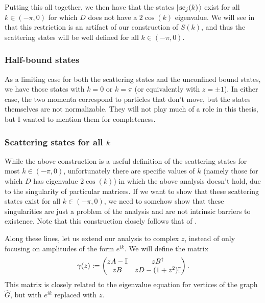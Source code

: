 \documentclass[../thesis-main/thesis-main]{subfiles}
\begin{document}
Putting this all together, we then have that the states $|\mspace{2mu} \text{sc}_j(k) \mspace{2mu} \rangle$ exist for all $k\in (-\pi,0)$ for which $D$ does not have a $2\cos(k)$ eigenvalue.  We will see in  that this restriction is an artifact of our construction of $S(k)$, and thus the scattering states will be well defined for all $k\in (-\pi,0)$.


\subsubsection{Half-bound states}

As a limiting case for both the scattering states and the unconfined bound states, we have those states with $k = 0$ or $k= \pi$ (or equivalently with $z = \pm 1$).  In either case, the two momenta correspond to particles that don't move, but the states themselves are not normalizable.  They will not play much of a role in this thesis, but I wanted to mention them for completeness.


\subsubsection{Scattering states for all $k$}\label{sec:def_of_gamma_matrix}

While the above construction is a useful definition of the scattering states for most ${k\in(-\pi,0)}$, unfortunately there are specific values of $k$ (namely those for which $D$ has eigenvalue $2\cos(k)$) in which the above analysis doesn't hold, due to the singularity of particular matrices.  If we want to show that these scattering states exist for all $k\in (-\pi,0)$, we need to somehow show that these singularities are just a problem of the analysis and are not intrinsic barriers to existence.  Note that this construction closely follows that of \cite{CG12}.

Along these lines, let us extend our analysis to complex $z$, instead of only focusing on amplitudes of the form $e^{ik}$.  We will define the matrix
\begin{equation}
  \gamma(z) := \begin{pmatrix}  z A - \mathbb{I} & z B^\dag\\
    z B & zD - (1+z^2) \mathbb{I}\end{pmatrix}.
    \label{eq:gamma_def}
\end{equation}
This matrix is closely related to the eigenvalue equation for vertices of the graph $\widehat{G}$, but with $e^{ik}$ replaced with $z$.  
\end{document}
